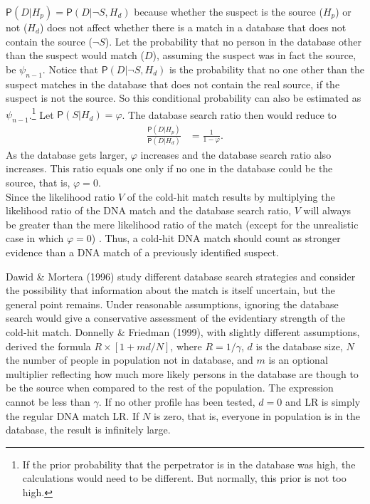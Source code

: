 \documentclass[
  10pt,
  dvipsnames,enabledeprecatedfontcommands]{scrartcl}
\newcommand{\pr}[1]{\mathsf{P}(#1)}
\begin{document}
\(\pr{D\vert H_p}=\pr{D\vert \neg S, H_d}\) because whether the suspect
is the source (\(H_p\)) or not (\(H_d\)) does not affect whether there
is a match in a database that does not contain the source (\(\neg S\)).
Let the probability that no person in the database other than the
suspect would match (\(D\)), assuming the suspect was in fact the
source, be \(\psi_{n-1}\). Notice that \(\pr{D\vert \neg S, H_d}\) is
the probability that no one other than the suspect matches in the
database that does not contain the real source, if the suspect is not
the source. So this conditional probability can also be estimated as
\(\psi_{n-1}\).\footnote{If the prior probability that the perpetrator is in the database was high, the calculations would need to be different. But normally, this prior is not too high.}
Let \(\pr{S | H_d}=\varphi\). The database search ratio then would
reduce to \vspace{-2mm} \begin{align*}
\frac{\pr{D\vert H_p}}{\pr{D\vert H_d}} & = \frac{1}{1-\varphi}.
\end{align*} \noindent As the database gets larger, \(\varphi\)
increases and the database search ratio also increases. This ratio
equals one only if no one in the database could be the source, that is,
\(\varphi=0\).\\
Since the likelihood ratio \(V\) of the cold-hit match results by
multiplying the likelihood ratio of the DNA match and the database
search ratio, \(V\) will always be greater than the mere likelihood
ratio of the match (except for the unrealistic case in which
\(\varphi=0\)) . Thus, a cold-hit DNA match should count as stronger
evidence than a DNA match of a previously identified suspect.

Dawid \& Mortera (1996) study different database search strategies and
consider the possibility that information about the match is itself
uncertain, but the general point remains. Under reasonable assumptions,
ignoring the database search would give a conservative assessment of the
evidentiary strength of the cold-hit match. Donnelly \& Friedman (1999),
with slightly different assumptions, derived the formula
\(R \times [1+md/N]\), where \(R = 1/\gamma\), \(d\) is the database
size, \(N\) the number of people in population not in database, and
\(m\) is an optional multiplier reflecting how much more likely persons
in the database are though to be the source when compared to the rest of
the population. The expression cannot be less than \(\gamma\). If no
other profile has been tested, \(d=0\) and LR is simply the regular DNA
match LR. If \(N\) is zero, that is, everyone in population is in the
database, the result is infinitely large.
\end{document}
